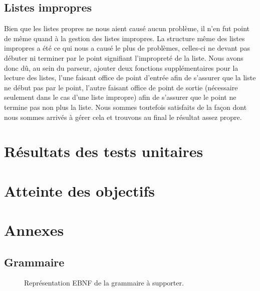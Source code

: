 \documentclass[12pt]{article}
\begin{document}
\subsection{Listes impropres}
Bien que les listes propres ne nous aient causé aucun problème, il n'en fut point de même quand à la gestion des listes impropres. La structure même des listes impropres a été ce qui nous a causé le plus de problèmes, celles-ci ne devant pas débuter ni terminer par le point signifiant l'impropreté de la liste. Nous avons donc dû, au sein du parseur, ajouter deux fonctions supplémentaires pour la lecture des listes, l'une faisant office de point d'entrée afin de s'assurer que la liste ne début pas par le point, l'autre faisant office de point de sortie (nécessaire seulement dans le cas d'une liste impropre) afin de s'assurer que le point ne termine pas non plus la liste. Nous sommes toutefois satisfaits de la façon dont nous sommes arrivés à gérer cela et trouvons au final le résultat assez propre.


\section{Résultats des tests unitaires}

\section{Atteinte des objectifs}


\section{Annexes}

\subsection{Grammaire}
\begin{figure}[h!]
  
  \caption{Représentation EBNF de la grammaire à supporter.}
\end{figure}
\end{document}
